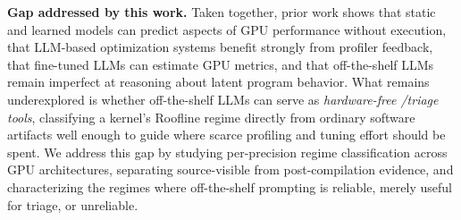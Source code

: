 \noindent\textbf{Gap addressed by this work.}
Taken together, prior work shows that static and learned models can predict aspects of GPU performance without execution, that LLM-based optimization systems benefit strongly from profiler feedback, that fine-tuned LLMs can estimate GPU metrics, and that off-the-shelf LLMs remain imperfect at reasoning about latent program behavior.
What remains underexplored is whether off-the-shelf LLMs can serve as \emph{hardware-free \bandwidthbound/\computebound triage tools}, classifying a kernel's Roofline regime directly from ordinary software artifacts well enough to guide where scarce profiling and tuning effort should be spent.
We address this gap by studying per-precision regime classification across GPU architectures, separating source-visible from post-compilation evidence, and characterizing the regimes where off-the-shelf prompting is reliable, merely useful for triage, or unreliable.

